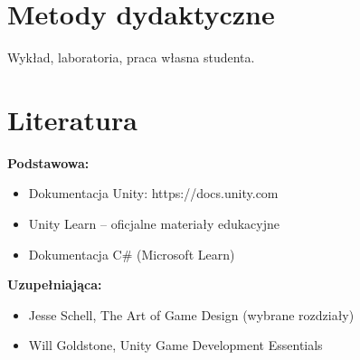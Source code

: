 \documentclass[12pt, a4paper]{article}
\begin{document}
\section{Metody dydaktyczne}

Wykład, laboratoria, praca własna studenta.

\section{Literatura}

\textbf{Podstawowa:}
\begin{itemize}
  \item Dokumentacja Unity: https://docs.unity.com
  \item Unity Learn – oficjalne materiały edukacyjne
  \item Dokumentacja C\# (Microsoft Learn)
\end{itemize}

\textbf{Uzupełniająca:}
\begin{itemize}
  \item Jesse Schell, The Art of Game Design (wybrane rozdziały)
  \item Will Goldstone, Unity Game Development Essentials
\end{itemize}
\end{document}
